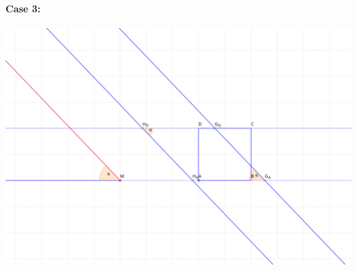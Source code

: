 \documentclass[a4paper,10pt,fleqn]{scrartcl}
\begin{document}
\paragraph{Case 3:}
\begin{minipage}{0.8\textwidth}
\includegraphics[width=\textwidth]{case3}
\end{minipage}
\end{document}

